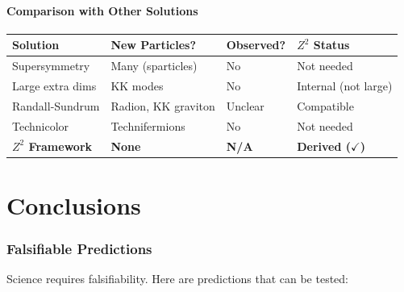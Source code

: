 \documentclass[11pt,a4paper]{article}
\theoremstyle{plain}
\theoremstyle{definition}
\theoremstyle{remark}
\begin{document}
\subsection{Comparison with Other Solutions}

\begin{center}
\begin{tabular}{llll}
\toprule
\textbf{Solution} & \textbf{New Particles?} & \textbf{Observed?} & \textbf{$Z^2$ Status} \\
\midrule
Supersymmetry & Many (sparticles) & No & Not needed \\
Large extra dims & KK modes & No & Internal (not large) \\
Randall-Sundrum & Radion, KK graviton & Unclear & Compatible \\
Technicolor & Technifermions & No & Not needed \\
\textbf{$Z^2$ Framework} & \textbf{None} & \textbf{N/A} & \textbf{Derived ($\checkmark$)} \\
\bottomrule
\end{tabular}
\end{center}

\part{Conclusions}

\section{Falsifiable Predictions}

Science requires falsifiability. Here are predictions that can be tested:
\end{document}
